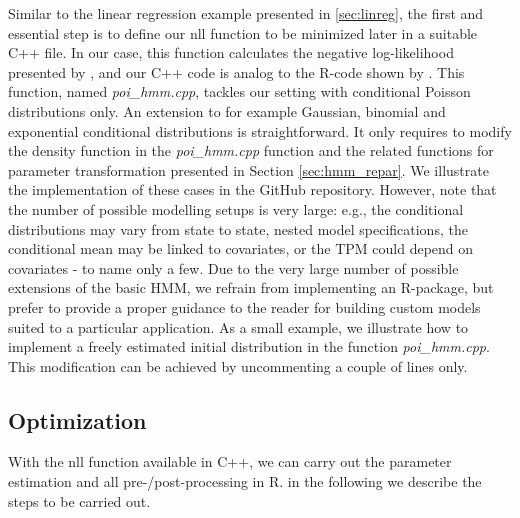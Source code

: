 \documentclass[bimj,fleqn]{w-art}\usepackage[]{graphicx}\usepackage[]{color}
\theoremstyle{plain}
\theoremstyle{definition}
\begin{document}
Similar to the linear regression example presented in \ref{sec:linreg}, the first and essential step is to define our nll function to be minimized later in a suitable C++ file. In our case, this function calculates the negative log-likelihood presented by \citet[p. ~48]{zucchini}, and our C++ code is analog to the R-code shown by \citet[p. ~331 - 333]{zucchini}. This function, named \textit{poi\_hmm.cpp}, tackles our setting with conditional Poisson distributions only. An extension to for example Gaussian, binomial and exponential conditional distributions is straightforward. It only requires to modify the density function in the \textit{poi\_hmm.cpp} function and the related functions for parameter transformation presented in Section \ref{sec:hmm_repar}. We illustrate the implementation of these cases in the GitHub repository. However, note that the number of possible modelling setups is very large: e.g., the conditional distributions may vary from state to state, nested model specifications, the conditional mean may be linked to covariates, or the TPM could depend on covariates - to name only a few. Due to the very large number of possible extensions of the basic HMM, we refrain from implementing an R-package, but prefer to provide a proper guidance to the reader for building custom models suited to a particular application. As a small example, we illustrate how to implement a freely estimated initial distribution in the function \textit{poi\_hmm.cpp}. This modification can be achieved by uncommenting a couple of lines only.  

\subsection{Optimization}
\label{sec:tmb_r}

With the nll function available in C++, we can carry out the parameter estimation and all pre-/post-processing in R. in the following we describe the steps to be carried out.
\end{document}
